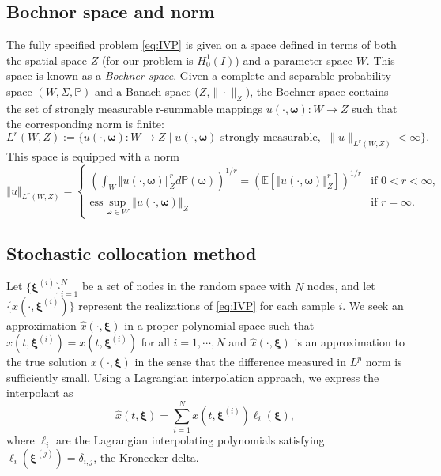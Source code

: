 \documentclass[final,3p,times,11pt]{elsarticle}
\begin{document}
\subsection{Bochnor space and norm}
The fully specified problem \eqref{eq:IVP} is given on a space defined in terms of both the spatial space $Z$ (for our problem is $H_0^1(I)$) and a parameter space $W$. This space is known as a {\it Bochner space}. Given a complete and separable probability space $\left(W,\Sigma,\mathbb{P}\right)$ and a Banach space ($Z$,$\|\cdot\|_Z$), the Bochner space contains the set of strongly measurable r-summable mappings $u(\cdot,\boldsymbol{\omega} ): W\rightarrow Z$ such that the corresponding norm is finite:
\[
L^r(W, Z):=\{u(\cdot,\boldsymbol{\omega} ):W\rightarrow Z\;\big\vert \; u(\cdot,\boldsymbol{\omega} ) \text{ strongly measurable,}\;\;\|u\|_{L^r(W,Z)}<\infty\}.
\]
This space is equipped with a norm 
\begin{equation*}
    \left\Vert u \right\Vert_{L^r(W,Z)} = 
    \left\{\begin{array}{ll} %
    \left(\int_W \left\Vert u(\cdot,\boldsymbol{\omega} ) \right\Vert_{Z}^r d\mathbb{P}(\boldsymbol{\omega}) \right)^{1/r} = \left(\mathbb{E}\left[\left\Vert u(\cdot,\boldsymbol{\omega}) \right\Vert_{Z}^r\right]\right)^{1/r} & \text{if } 0 <r<\infty,  \\
\text{ess}\sup_{\boldsymbol{\omega}\in W} \left\Vert u(\cdot,\boldsymbol{\omega}) \right\Vert_Z& \text{if } r=\infty.
\end{array}\right.
\end{equation*}

\subsection{Stochastic collocation method}
Let $\{\boldsymbol{\xi}^{(i)}\}_{i=1}^N$ be a set of nodes in the random space with $N$ nodes, and let $\{x(\cdot,\boldsymbol{\xi}^{(i)})\}$ represent the realizations of \eqref{eq:IVP} for each sample $i$. We seek an approximation $\widehat{x}(\cdot, \boldsymbol{\xi})$ in a proper polynomial space such that $\widehat{x}(t,\boldsymbol{\xi}^{(i)}) = x(t, \boldsymbol{\xi}^{(i)})$ for all $i=1,\cdots, N$ and $\widehat{x}(\cdot, \boldsymbol{\xi})$ is an approximation to the true solution $x(\cdot, \boldsymbol{\xi})$ in the sense that the difference measured in $L^p$ norm is sufficiently small. Using a Lagrangian interpolation approach, we express the interpolant as
\[
\widehat{x}(t,\boldsymbol{\xi}) = \sum_{i=1}^N x(t, \boldsymbol{\xi}^{(i)})\ell_i(\boldsymbol{\xi}),
\]
where $\ell_i$ are the Lagrangian interpolating polynomials satisfying $\ell_i(\boldsymbol{\xi}^{(j)})=\delta_{i,j}$, the Kronecker delta.
\end{document}
